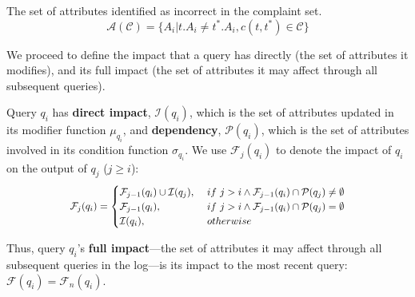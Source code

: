 \begin{definition} 
	The set of attributes identified as incorrect in the complaint set.
	\[\mathcal{A}(\mathcal{C}) = \{A_i | t.A_i \neq t^*.A_i, c(t,t^*) \in \mathcal{C}\}\]
\end{definition} 

We proceed to define the impact that a query has directly (the set of
attributes it modifies), and its full impact (the set of attributes it may
affect through all subsequent queries).

\begin{definition} \label{eq:dependency}
    Query $q_i$ has \textbf{direct impact}, $\mathcal{I}(q_i)$, which is
    the set of attributes updated in its modifier function $\mu_{q_i}$,
    and \textbf{dependency},
    $\mathcal{P}(q_i)$, which is the set of attributes involved in its condition function $\sigma_{q_i}$. 
    We use $\mathcal{F}_j(q_i)$ to denote the impact of $q_i$ on the output of $q_j$ ($j \geq i$):
    \[\Scale[0.9]{
    \mathcal{F}_{j}(q_i)=
    \begin{cases}
    \mathcal{F}_{j-1}(q_i) \cup \mathcal{I}(q_j),&\ if\ j > i \wedge \mathcal{F}_{j-1}(q_i) \cap \mathcal{P}(q_{j}) \neq \emptyset \\
    \mathcal{F}_{j-1}(q_i),&\ if\ j > i \wedge \mathcal{F}_{j-1}(q_i) \cap \mathcal{P}(q_{j}) = \emptyset\\
    \mathcal{I}(q_i),&\ otherwise
    \end{cases}}
    \]

    Thus, query $q_i$'s \textbf{full impact}---the set of attributes it may affect through all subsequent queries in the log---is its
    impact to the most recent query: $\mathcal{F}(q_i) = \mathcal{F}_{n}(q_i)$.
    

\end{definition}

